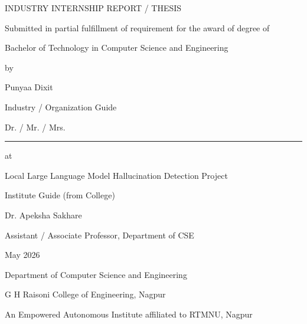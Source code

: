 \documentclass[12pt,a4paper]{report}
\begin{document}
\begin{titlepage}
\centering
{\Large INDUSTRY INTERNSHIP REPORT / THESIS\par}
\vspace{0.8cm}
{\normalsize Submitted in partial fulfillment of requirement for the award of degree of\par}
\vspace{0.5cm}
{\Large Bachelor of Technology in Computer Science and Engineering\par}
\vspace{0.8cm}
{\large by\par}
\vspace{0.3cm}
{\Large Punyaa Dixit\par}
\vspace{0.8cm}
{\large Industry / Organization Guide\par}
{\large Dr. / Mr. / Mrs. \rule{7cm}{0.4pt}\par}
\vspace{0.6cm}
{\large at\par}
{\Large Local Large Language Model Hallucination Detection Project\par}
\vspace{0.6cm}
{\large Institute Guide (from College)\par}
{\large Dr. Apeksha Sakhare\par}
{\large Assistant / Associate Professor, Department of CSE\par}
\vspace{0.8cm}
{\large May 2026\par}
\vfill
{\large Department of Computer Science and Engineering\par}
{\large G H Raisoni College of Engineering, Nagpur\par}
{\normalsize An Empowered Autonomous Institute affiliated to RTMNU, Nagpur\par}
\end{titlepage}
\end{document}
